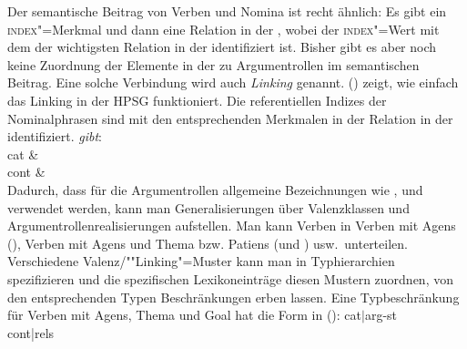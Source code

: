 Der semantische Beitrag von Verben und Nomina ist recht ähnlich: Es gibt ein \textsc{index}"=Merkmal
und dann eine Relation in der \relsl, wobei der \textsc{index}"=Wert mit dem \argzero der
wichtigsten Relation in der \relsl identifiziert ist. Bisher gibt es aber noch keine Zuordnung der Elemente in der \argstl{} zu
Argumentrollen im semantischen Beitrag. Eine solche Verbindung wird auch \emph{Linking} genannt.
() zeigt, wie einfach das Linking in der HPSG funktioniert.
Die referentiellen Indizes der Nominalphrasen sind mit den entsprechenden Merkmalen in der Relation
in der \relsl identifiziert.
\eas
\label{le-gibt}%
\emph{gibt}:\\
\ms
{ cat &  \\
  cont &  \\
}
\zs
Dadurch, dass für die Argumentrollen allgemeine Bezeichnungen wie \argone, \argtwo und \argthree
verwendet werden, kann man Generalisierungen über Valenzklassen und
Argumentrollenrealisierungen aufstellen. Man kann \zb Verben in Verben mit Agens (\argone), Verben mit Agens
und Thema bzw. Patiens (\argone und \argtwo) usw.\ unterteilen. Verschiedene Valenz/""Linking"=Muster kann man
in Typhierarchien spezifizieren und die spezifischen Lexikoneinträge diesen Mustern zuordnen,
\dash von den entsprechenden Typen Beschränkungen erben lassen. Eine Typbeschränkung für
Verben mit Agens, Thema und Goal hat die Form in ():
\ea
\label{bsp-linking-arg123}
\onems
{ cat$|$arg-st  \\[1mm]
  cont|rels  \\
}
